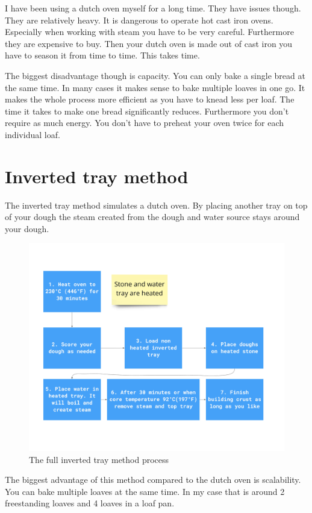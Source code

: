 I have been using a dutch oven myself for a long time. They
have issues though. They are relatively heavy. It is dangerous
to operate hot cast iron ovens. Especially when working with steam
you have to be very careful.  Furthermore
they are expensive to buy. Then your dutch oven is made out
of cast iron you have to season it from time to time. This takes
time.

The biggest disadvantage though is
capacity. You can only bake a single bread at the
same time. In many cases it makes sense to bake multiple
loaves in one go. It makes the whole process more
efficient as you have to knead less per loaf. The time it
takes to make one bread significantly reduces. Furthermore
you don't require as much energy. You don't have
to preheat your oven twice for each individual loaf.


\section{Inverted tray method}

The inverted tray method simulates a dutch oven.
By placing another tray on top of your dough the steam
created from the dough and water source stays
around your dough.

\begin{figure}[!htb]
  \includegraphics[width=\textwidth]{baking-process-overview.jpg}
  \caption{The full inverted tray method process}
\end{figure}


The biggest advantage of this method compared to the
dutch oven is scalability. You can bake multiple loaves
at the same time. In my case that is around 2 freestanding
loaves and 4 loaves in a loaf pan.

